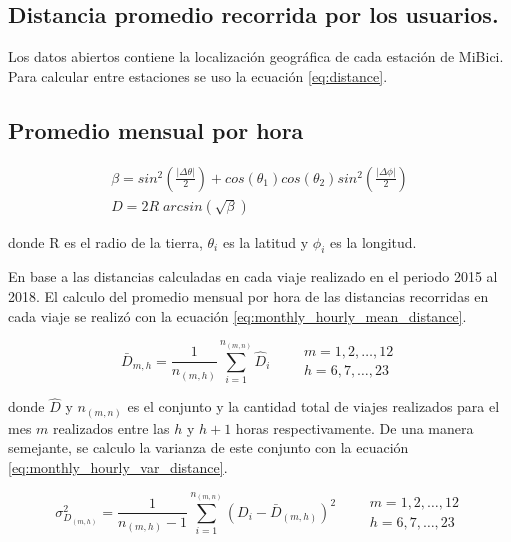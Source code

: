 \subsection{Distancia promedio recorrida por los usuarios.}

Los datos abiertos contiene la localización geográfica de cada estación de MiBici. Para calcular entre estaciones se uso la ecuación \ref{eq:distance}.

\subsection{Promedio mensual por hora}

\begin{equation}
    \begin{matrix}
        \beta = sin^2\left ( \frac{|\Delta \theta|}{2} \right ) + cos \left (\theta_1\right )  cos(\theta_2)sin^2 \left (\frac{|\Delta \phi|}{2} \right ) \\
        D     = 2R\;arcsin\left (\sqrt{\beta} \right )
    \end{matrix}
    \label{eq:distance}
\end{equation}

donde R es el radio de la tierra, $\theta_i$ es la latitud y $\phi_i$ es la longitud.

En base a las distancias calculadas en cada viaje realizado en el periodo 2015 al 2018. El calculo del promedio mensual por hora de las distancias recorridas en cada viaje se realizó con la ecuación \ref{eq:monthly_hourly_mean_distance}.

\begin{equation}
    \bar{D}_{m,h} = \frac{1}{n_{(m,h)}} \sum_{i=1}^{n_{(m,n)}} \hat{D}_{i} \qquad \begin{matrix}
        m=1,2,\dots,12 \\ h=6,7,\dots,23
    \end{matrix} \label{eq:monthly_hourly_mean_distance}
\end{equation}

donde $\hat{D}$ y $n_{(m,n)}$ es el conjunto y la cantidad total de viajes realizados para el mes $m$ realizados entre las $h$ y $h+1$ horas respectivamente. De una manera semejante, se calculo la varianza de este conjunto con la ecuación \ref{eq:monthly_hourly_var_distance}.

\begin{equation}
    \sigma^2_{D_{(m,h)}} = \frac{1}{n_{(m,h)}-1} \sum_{i=1}^{n_{(m,n)}} (D_i-\bar{D}_{(m,h)})^2 \qquad \begin{matrix}
        m=1,2,\dots,12 \\ h=6,7,\dots,23
    \end{matrix} \label{eq:monthly_hourly_var_distance}
\end{equation}

